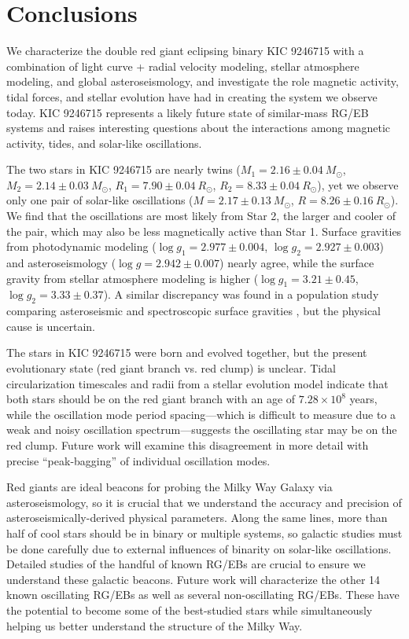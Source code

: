 \section{Conclusions}\label{conclude}
We characterize the double red giant eclipsing binary KIC 9246715 with a combination of light curve + radial velocity modeling, stellar atmosphere modeling, and global asteroseismology, and investigate the role magnetic activity, tidal forces, and stellar evolution have had in creating the system we observe today. KIC 9246715 represents a likely future state of similar-mass RG/EB systems and raises interesting questions about the interactions among magnetic activity, tides, and solar-like oscillations.

The two stars in KIC 9246715 are nearly twins ($M_1 = 2.16 \pm 0.04\ M_{\odot}$, $M_2 = 2.14 \pm 0.03\ M_{\odot}$, $R_1 = 7.90 \pm 0.04 \ R_{\odot}$, $R_2 = 8.33 \pm 0.04 \ R_{\odot}$), yet we observe only one pair of solar-like oscillations ($M = 2.17 \pm 0.13 \ M_{\odot}$, $R = 8.26 \pm 0.16 \ R_{\odot}$). We find that the oscillations are most likely from Star 2, the larger and cooler of the pair, which may also be less magnetically active than Star 1. Surface gravities from photodynamic modeling ($\log g_1 = 2.977 \pm 0.004$, $\log g_2 = 2.927 \pm 0.003$) and asteroseismology ($\log g = 2.942 \pm 0.007$) nearly agree, while the surface gravity from stellar atmosphere modeling is higher ($\log g_1 = 3.21 \pm 0.45$, $\log g_2 = 3.33 \pm 0.37$). A similar discrepancy was found in a population study comparing asteroseismic and spectroscopic surface gravities \citep{hol15}, but the physical cause is uncertain.

The stars in KIC 9246715 were born and evolved together, but the present evolutionary state (red giant branch vs. red clump) is unclear. Tidal circularization timescales and radii from a stellar evolution model indicate that both stars should be on the red giant branch with an age of $7.28 \times 10^8$ years, while the oscillation mode period spacing---which is difficult to measure due to a weak and noisy oscillation spectrum---suggests the oscillating star may be on the red clump. Future work will examine this disagreement in more detail with precise ``peak-bagging'' of individual oscillation modes.

Red giants are ideal beacons for probing the Milky Way Galaxy via asteroseismology, so it is crucial that we understand the accuracy and precision of asteroseismically-derived physical parameters. Along the same lines, more than half of cool stars should be in binary or multiple systems, so galactic studies must be done carefully due to external influences of binarity on solar-like oscillations. Detailed studies of the handful of known RG/EBs are crucial to ensure we understand these galactic beacons. Future work will characterize the other 14 known oscillating RG/EBs as well as several non-oscillating RG/EBs. These have the potential to become some of the best-studied stars while simultaneously helping us better understand the structure of the Milky Way.
  
  
  
  
  
  